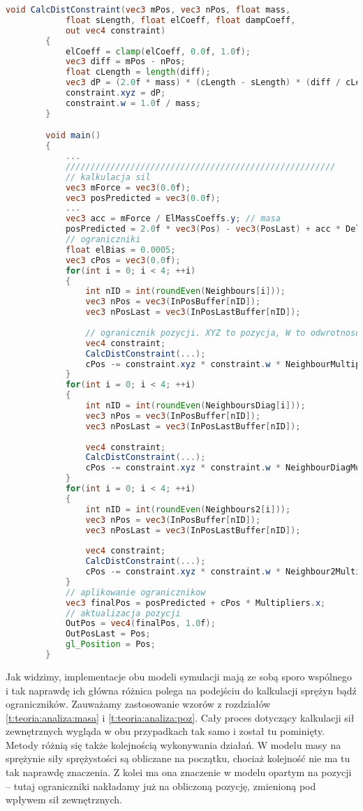 		
		\begin{lstlisting}[language=GLSL]
		void CalcDistConstraint(vec3 mPos, vec3 nPos, float mass, 
			float sLength, float elCoeff, float dampCoeff,
			out vec4 constraint)
		{
			elCoeff = clamp(elCoeff, 0.0f, 1.0f);
			vec3 diff = mPos - nPos;
			float cLength = length(diff);
			vec3 dP = (2.0f * mass) * (cLength - sLength) * (diff / cLength) * elCoeff;
			constraint.xyz = dP;
			constraint.w = 1.0f / mass;
		}

		void main()
		{
			...
			//////////////////////////////////////////////////////
			// kalkulacja sil
			vec3 mForce = vec3(0.0f);
			vec3 posPredicted = vec3(0.0f);
			...
			vec3 acc = mForce / ElMassCoeffs.y;	// masa
			posPredicted = 2.0f * vec3(Pos) - vec3(PosLast) + acc * DeltaTime * DeltaTime;
			// ograniczniki
			float elBias = 0.0005;
			vec3 cPos = vec3(0.0f);
			for(int i = 0; i < 4; ++i)
			{
				int nID = int(roundEven(Neighbours[i]));
				vec3 nPos = vec3(InPosBuffer[nID]);
				vec3 nPosLast = vec3(InPosLastBuffer[nID]);
				
				// ogranicznik pozycji. XYZ to pozycja, W to odwrotnosc masy
				vec4 constraint;
				CalcDistConstraint(...);
				cPos -= constraint.xyz * constraint.w * NeighbourMultipliers[i];
			}
			for(int i = 0; i < 4; ++i)
			{
				int nID = int(roundEven(NeighboursDiag[i]));
				vec3 nPos = vec3(InPosBuffer[nID]);
				vec3 nPosLast = vec3(InPosLastBuffer[nID]);
				
				vec4 constraint;
				CalcDistConstraint(...);
				cPos -= constraint.xyz * constraint.w * NeighbourDiagMultipliers[i];
			}
			for(int i = 0; i < 4; ++i)
			{
				int nID = int(roundEven(Neighbours2[i]));
				vec3 nPos = vec3(InPosBuffer[nID]);
				vec3 nPosLast = vec3(InPosLastBuffer[nID]);
				
				vec4 constraint;
				CalcDistConstraint(...);
				cPos -= constraint.xyz * constraint.w * Neighbour2Multipliers[i];
			}
			// aplikowanie ogranicznikow
			vec3 finalPos = posPredicted + cPos * Multipliers.x;
			// aktualizacja pozycji
			OutPos = vec4(finalPos, 1.0f);
			OutPosLast = Pos;
			gl_Position = Pos;
		}	
		\end{lstlisting}
		
		Jak widzimy, implementacje obu modeli symulacji mają ze sobą sporo wspólnego i tak naprawdę ich główna różnica polega na podejściu do kalkulacji sprężyn bądź ograniczników. Zauważamy zastosowanie wzorów z rozdziałów \ref{t:teoria:analiza:masa} i \ref{t:teoria:analiza:poz}. Cały proces dotyczący kalkulacji sił zewnętrznych wygląda w obu przypadkach tak samo i został tu pominięty. Metody różnią się także kolejnością wykonywania działań. W modelu masy na sprężynie siły sprężystości są obliczane na początku, chociaż kolejność nie ma tu tak naprawdę znaczenia. Z kolei ma ona znaczenie w modelu opartym na pozycji -- tutaj ograniczniki nakładamy już na obliczoną pozycję, zmienioną pod wpływem sił zewnętrznych.
		
